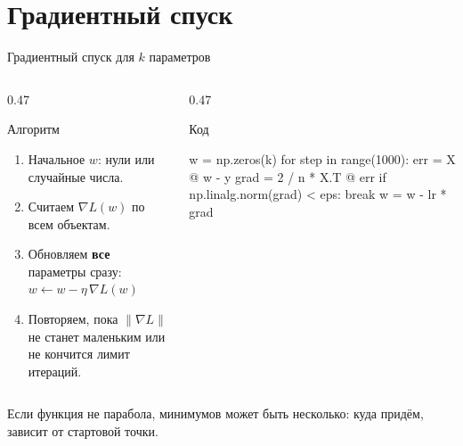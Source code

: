 \section{Градиентный спуск}

\begin{frame}[c,fragile]{Градиентный спуск для $k$ параметров}
  \begin{columns}[T]
    \begin{column}{0.47\textwidth}
      \begin{block}{Алгоритм}
        \small
        \begin{enumerate}\setlength\itemsep{0.25em}
          \item Начальное $w$: нули или случайные числа.
          \item Считаем $\nabla L(w)$ по всем объектам.
          \item Обновляем \textbf{все} параметры сразу:
            \(w \leftarrow w - \eta\,\nabla L(w)\)
          \item Повторяем, пока $\lVert\nabla L\rVert$ не станет маленьким
            или не кончится лимит итераций.
        \end{enumerate}
      \end{block}
    \end{column}
    \begin{column}{0.47\textwidth}
      \begin{block}{Код}
        \small
\begin{semiverbatim}
w = np.zeros(k)
for step in range(1000):
    err = X @ w - y
    grad = 2 / n * X.T @ err
    if np.linalg.norm(grad) < eps:
        break
    w = w - lr * grad
\end{semiverbatim}
      \end{block}
    \end{column}
  \end{columns}

  \medskip
  {\footnotesize\color{acGray}Если функция не парабола, минимумов может быть несколько:
  куда придём, зависит от стартовой точки.\par}
\end{frame}

